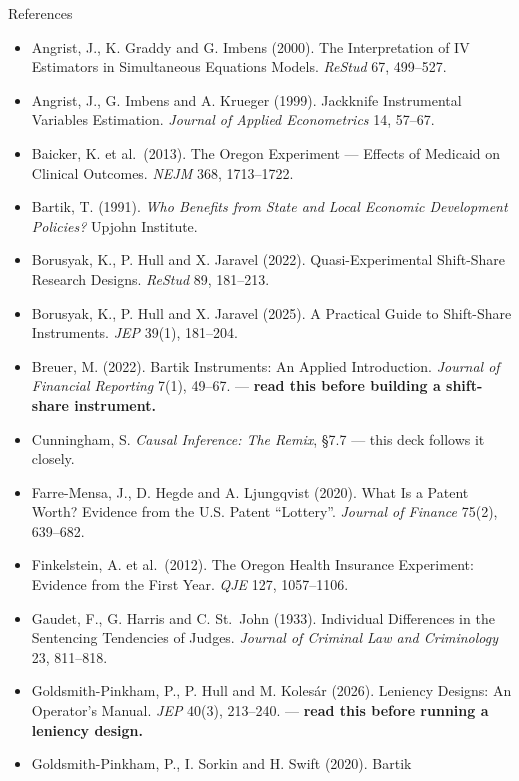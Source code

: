 \documentclass[
  11pt,
  ignorenonframetext,
  aspectratio=169,
]{beamer}
\providecommand{\tightlist}{%
  \setlength{\itemsep}{0pt}\setlength{\parskip}{0pt}}
\begin{document}
\begin{frame}{References}
\protect{}\label{references}
\tiny

\begin{itemize}
\tightlist
\item
  Angrist, J., K. Graddy and G. Imbens (2000). The Interpretation of IV
  Estimators in Simultaneous Equations Models. \emph{ReStud} 67,
  499--527.
\item
  Angrist, J., G. Imbens and A. Krueger (1999). Jackknife Instrumental
  Variables Estimation. \emph{Journal of Applied Econometrics} 14,
  57--67.
\item
  Baicker, K. et al.~(2013). The Oregon Experiment --- Effects of
  Medicaid on Clinical Outcomes. \emph{NEJM} 368, 1713--1722.
\item
  Bartik, T. (1991). \emph{Who Benefits from State and Local Economic
  Development Policies?} Upjohn Institute.
\item
  Borusyak, K., P. Hull and X. Jaravel (2022). Quasi-Experimental
  Shift-Share Research Designs. \emph{ReStud} 89, 181--213.
\item
  Borusyak, K., P. Hull and X. Jaravel (2025). A Practical Guide to
  Shift-Share Instruments. \emph{JEP} 39(1), 181--204.
\item
  Breuer, M. (2022). Bartik Instruments: An Applied Introduction.
  \emph{Journal of Financial Reporting} 7(1), 49--67. --- \textbf{read
  this before building a shift-share instrument.}
\item
  Cunningham, S. \emph{Causal Inference: The Remix}, §7.7 --- this deck
  follows it closely.
\item
  Farre-Mensa, J., D. Hegde and A. Ljungqvist (2020). What Is a Patent
  Worth? Evidence from the U.S. Patent ``Lottery''. \emph{Journal of
  Finance} 75(2), 639--682.
\item
  Finkelstein, A. et al.~(2012). The Oregon Health Insurance Experiment:
  Evidence from the First Year. \emph{QJE} 127, 1057--1106.
\item
  Gaudet, F., G. Harris and C. St.~John (1933). Individual Differences
  in the Sentencing Tendencies of Judges. \emph{Journal of Criminal Law
  and Criminology} 23, 811--818.
\item
  Goldsmith-Pinkham, P., P. Hull and M. Kolesár (2026). Leniency
  Designs: An Operator's Manual. \emph{JEP} 40(3), 213--240. ---
  \textbf{read this before running a leniency design.}
\item
  Goldsmith-Pinkham, P., I. Sorkin and H. Swift (2020). Bartik

\end{itemize}
\end{frame}
\end{document}
